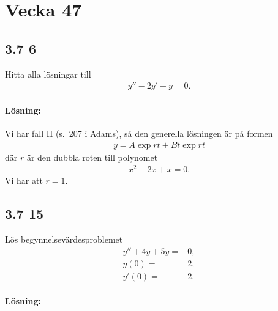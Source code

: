 \section{Vecka 47}%
\label{sec:vecka_47}

\subsection{3.7 6}%
\label{sub:3_7_6}

Hitta alla lösningar till
\begin{align*}
	y'' - 2 y' + y = 0.
\end{align*}

\paragraph{Lösning:}

Vi har fall II (s.\ 207 i Adams), så den generella lösningen är på formen
\begin{align*}
	y = A \exp{r t} + B t \exp{r t}
\end{align*}
där $r$ är den dubbla roten till polynomet
\begin{align*}
	x^2 - 2 x + x = 0.
\end{align*}
Vi har att $r = 1$.


\subsection{3.7 15}%
\label{sub:3_7_15}

Lös begynnelsevärdesproblemet
\begin{align}
	y'' + 4 y + 5 y ={}& 0,%
	\label{eq:3_7_15_diffeq}\\
	y(0) ={}& 2,%
	\label{eq:3_7_15_boundcon1}\\
	y'(0) ={}& 2.%
	\label{eq:3_7_15_boundcon2}
\end{align}

\paragraph{Lösning:}

